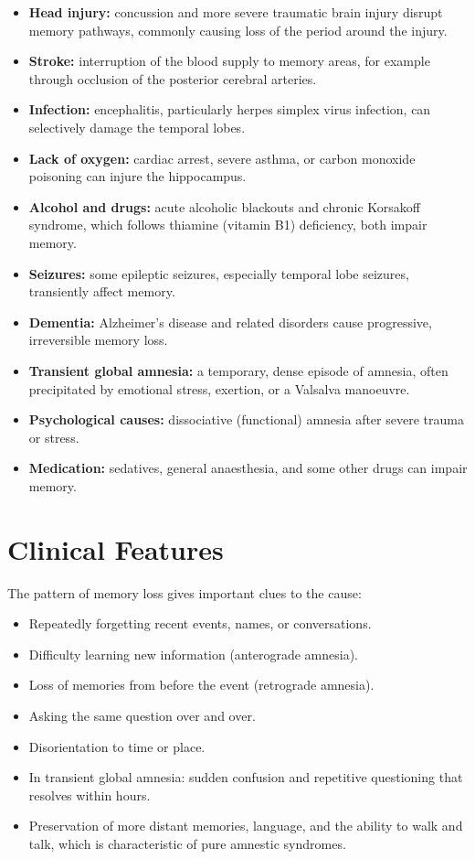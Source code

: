 \begin{itemize}
    \item \textbf{Head injury:} concussion and more severe traumatic brain injury disrupt memory pathways, commonly causing loss of the period around the injury.
    \item \textbf{Stroke:} interruption of the blood supply to memory areas, for example through occlusion of the posterior cerebral arteries.
    \item \textbf{Infection:} encephalitis, particularly herpes simplex virus infection, can selectively damage the temporal lobes.
    \item \textbf{Lack of oxygen:} cardiac arrest, severe asthma, or carbon monoxide poisoning can injure the hippocampus.
    \item \textbf{Alcohol and drugs:} acute alcoholic blackouts and chronic Korsakoff syndrome, which follows thiamine (vitamin B1) deficiency, both impair memory.
    \item \textbf{Seizures:} some epileptic seizures, especially temporal lobe seizures, transiently affect memory.
    \item \textbf{Dementia:} Alzheimer's disease and related disorders cause progressive, irreversible memory loss.
    \item \textbf{Transient global amnesia:} a temporary, dense episode of amnesia, often precipitated by emotional stress, exertion, or a Valsalva manoeuvre.
    \item \textbf{Psychological causes:} dissociative (functional) amnesia after severe trauma or stress.
    \item \textbf{Medication:} sedatives, general anaesthesia, and some other drugs can impair memory.
\end{itemize}

\section*{Clinical Features}
The pattern of memory loss gives important clues to the cause:

\begin{itemize}
    \item Repeatedly forgetting recent events, names, or conversations.
    \item Difficulty learning new information (anterograde amnesia).
    \item Loss of memories from before the event (retrograde amnesia).
    \item Asking the same question over and over.
    \item Disorientation to time or place.
    \item In transient global amnesia: sudden confusion and repetitive questioning that resolves within hours.
    \item Preservation of more distant memories, language, and the ability to walk and talk, which is characteristic of pure amnestic syndromes.
\end{itemize}

